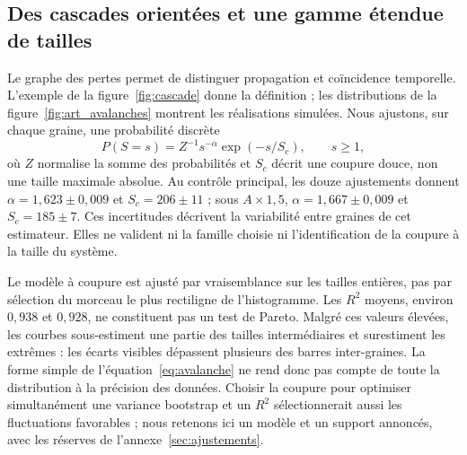 \subsection{Des cascades orientées et une gamme étendue de tailles}
Le graphe des pertes permet de distinguer propagation et coïncidence temporelle.
L'exemple de la figure~\ref{fig:cascade} donne la définition ; les distributions
de la figure~\ref{fig:art_avalanches} montrent les réalisations simulées.
Nous ajustons, sur chaque graine, une probabilité discrète
\begin{equation}
 P(S=s)=Z^{-1}s^{-\alpha}\exp(-s/S_c),\qquad s\ge1,
 \label{eq:avalanche}
\end{equation}
où $Z$ normalise la somme des probabilités et $S_c$ décrit une coupure douce,
non une taille maximale absolue. Au contrôle principal, les douze ajustements
donnent $\alpha=1{,}623\pm0{,}009$ et $S_c=206\pm11$ ; sous
$A\times1{,}5$, $\alpha=1{,}667\pm0{,}009$ et $S_c=185\pm7$.
Ces incertitudes décrivent la variabilité entre graines de cet estimateur.
Elles ne valident ni la famille choisie ni l'identification de la coupure
à la taille du système.


Le modèle à coupure est ajusté par vraisemblance sur les tailles entières,
pas par sélection du morceau le plus rectiligne de l'histogramme. Les
$R^2$ moyens, environ $0{,}938$ et $0{,}928$, ne constituent pas un test
de Pareto. Malgré ces valeurs élevées, les courbes sous-estiment une partie
des tailles intermédiaires et surestiment les extrêmes : les écarts visibles
dépassent plusieurs des barres inter-graines. La forme simple
de l'équation~\eqref{eq:avalanche} ne rend donc pas compte de toute la
distribution à la précision des données. Choisir la coupure pour
optimiser simultanément une variance bootstrap et un $R^2$ sélectionnerait
aussi les fluctuations favorables ; nous retenons ici un modèle et un support
annoncés, avec les réserves de l'annexe~\ref{sec:ajustements}.

